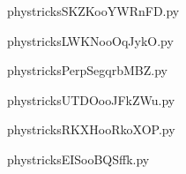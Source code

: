     \newcommand{\CaptionFigSKZKooYWRnFD}{<+Type your caption here+>}
    \begin{center}
        
    \end{center}
    phystricksSKZKooYWRnFD.py

    

    \clearpage
    


    \newcommand{\CaptionFigLWKNooOqJykO}{<+Type your caption here+>}
    \begin{center}
        
    \end{center}
    phystricksLWKNooOqJykO.py

    

    \clearpage
    


    \newcommand{\CaptionFigPerpSegqrbMBZ}{<+Type your caption here+>}
    \begin{center}
        
    \end{center}
    phystricksPerpSegqrbMBZ.py

    

    \clearpage
    


    \newcommand{\CaptionFigUTDOooJFkZWu}{<+Type your caption here+>}
    \begin{center}
        
    \end{center}
    phystricksUTDOooJFkZWu.py

    

    \clearpage
    


    \newcommand{\CaptionFigRKXHooRkoXOP}{<+Type your caption here+>}
    \begin{center}
        
    \end{center}
    phystricksRKXHooRkoXOP.py

    

    \clearpage
    


    \newcommand{\CaptionFigEISooBQSffk}{<+Type your caption here+>}
    \begin{center}
        
    \end{center}
    phystricksEISooBQSffk.py

